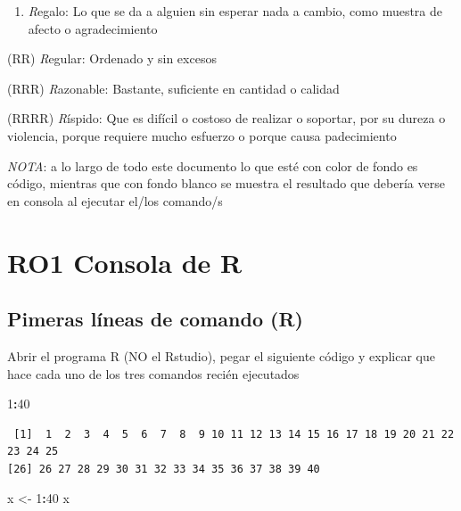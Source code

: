 \documentclass[]{book}
\newenvironment{Shaded}{\begin{snugshade}}{\end{snugshade}}
\newcommand{\DecValTok}[1]{\textcolor[rgb]{0.00,0.00,0.81}{#1}}
\newcommand{\NormalTok}[1]{#1}
\newcommand{\OperatorTok}[1]{\textcolor[rgb]{0.81,0.36,0.00}{\textbf{#1}}}
\newcommand{\StringTok}[1]{\textcolor[rgb]{0.31,0.60,0.02}{#1}}
\providecommand{\tightlist}{%
  \setlength{\itemsep}{0pt}\setlength{\parskip}{0pt}}
\begin{document}
\begin{enumerate}
\def\labelenumi{(\Alph{enumi})}
\setcounter{enumi}{17}
\tightlist
\item
  {\emph{\emph{R}}}egalo: Lo que se da a alguien sin esperar nada a cambio, como muestra de afecto o agradecimiento
\end{enumerate}

(RR) {\emph{\emph{R}}}egular: Ordenado y sin excesos

(RRR) {\emph{\emph{R}}}azonable: Bastante, suficiente en cantidad o calidad

(RRRR) {\emph{\emph{R}}}íspido: Que es difícil o costoso de realizar o soportar, por su dureza o violencia, porque requiere mucho esfuerzo o porque causa padecimiento

\emph{\emph{NOTA}}: a lo largo de todo este documento lo que esté con color de fondo es código, mientras que con fondo blanco se muestra el resultado que debería verse en consola al ejecutar el/los comando/s

\hypertarget{ro1-consola-de-r}{%
\chapter*{RO1 Consola de R}\label{ro1-consola-de-r}}

\hypertarget{pimeras-luxedneas-de-comando-r}{%
\section{Pimeras líneas de comando (R)}\label{pimeras-luxedneas-de-comando-r}}

Abrir el programa R ({NO} el Rstudio), pegar el siguiente código y explicar que hace cada uno de los tres comandos recién ejecutados

\begin{Shaded}
\begin{Highlighting}[]
\DecValTok{1}\OperatorTok{:}\DecValTok{40}
\end{Highlighting}
\end{Shaded}

\begin{verbatim}
 [1]  1  2  3  4  5  6  7  8  9 10 11 12 13 14 15 16 17 18 19 20 21 22 23 24 25
[26] 26 27 28 29 30 31 32 33 34 35 36 37 38 39 40
\end{verbatim}

\begin{Shaded}
\begin{Highlighting}[]
\NormalTok{x <-}\StringTok{ }\DecValTok{1}\OperatorTok{:}\DecValTok{40}
\NormalTok{x}
\end{Highlighting}
\end{Shaded}
\end{document}
